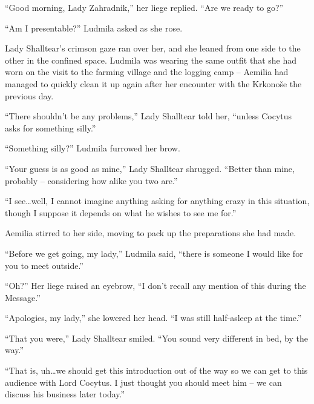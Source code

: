  

“Good morning, Lady Zahradnik,” her liege replied. “Are we ready to go?”

 

“Am I presentable?” Ludmila asked as she rose.

 

Lady Shalltear’s crimson gaze ran over her, and she leaned from one side to the other in the confined space. Ludmila was wearing the same outfit that she had worn on the visit to the farming village and the logging camp – Aemilia had managed to quickly clean it up again after her encounter with the Krkonoše the previous day.

 

“There shouldn't be any problems,” Lady Shalltear told her, “unless Cocytus asks for something silly.”

 

“Something silly?” Ludmila furrowed her brow.

 

“Your guess is as good as mine,” Lady Shalltear shrugged. “Better than mine, probably – considering how alike you two are.”

 

“I see…well, I cannot imagine anything asking for anything crazy in this situation, though I suppose it depends on what he wishes to see me for.”

 

Aemilia stirred to her side, moving to pack up the preparations she had made.

 

“Before we get going, my lady,” Ludmila said, “there is someone I would like for you to meet outside.”

 

“Oh?” Her liege raised an eyebrow, “I don’t recall any mention of this during the Message.”

 

“Apologies, my lady,” she lowered her head. “I was still half-asleep at the time.”

 

“That you were,” Lady Shalltear smiled. “You sound very different in bed, by the way.”

 

“That is, uh…we should get this introduction out of the way so we can get to this audience with Lord Cocytus. I just thought you should meet him – we can discuss his business later today.”

 

